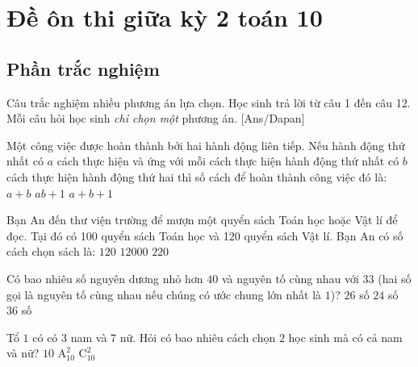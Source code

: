 
\section{Đề ôn thi giữa kỳ 2 toán 10}
\subsection{Phần trắc nghiệm}
Câu trắc nghiệm nhiều phương án lựa chọn. Học sinh trả lời từ
câu 1 đến câu 12. Mỗi câu hỏi học sinh \textit{chỉ chọn một} phương án.
[Ans/Dapan]

\hienthiloigiaiex
\begin{ex}%
	Một công việc được hoàn thành bởi hai hành động liên tiếp. Nếu hành động thứ nhất có $a$ cách thực hiện và ứng với mỗi cách thực hiện hành động thứ nhất có $b$ cách thực hiện hành động thứ hai thì số cách để hoàn thành công việc đó là:
	{$a+b$}
	{$a b+1$}
	{$a+b+1$}
\end{ex}
\begin{ex}%
	Bạn An đến thư viện trường để mượn một quyển sách Toán học hoặc Vật lí để đọc. Tại đó có 100 quyển sách Toán học và 120 quyển sách Vật lí. Bạn An có số cách chọn sách là:
	{$120$}
	{$12000$}
	{\True $220$}
\end{ex}
\begin{ex}%
	Có bao nhiêu số nguyên dương nhỏ hơn $40$ và nguyên tố cùng nhau với $33$ (hai số gọi là nguyên tố cùng nhau nếu chúng có ước chung lớn nhất là $1$)?
	{$26$ số}
	{\True$24$ số}
	{ $36$ số}
\end{ex}
\begin{ex}%
	Tổ $1$ có có $3$ nam và $7$ nữ. Hỏi có bao nhiêu cách chọn $2$ học sinh mà có cả nam và nữ?
	{$10$}
	{\True $\mathrm{A}_{10}^2$}
	{$\mathrm{C}_{10}^2$}
\end{ex}

